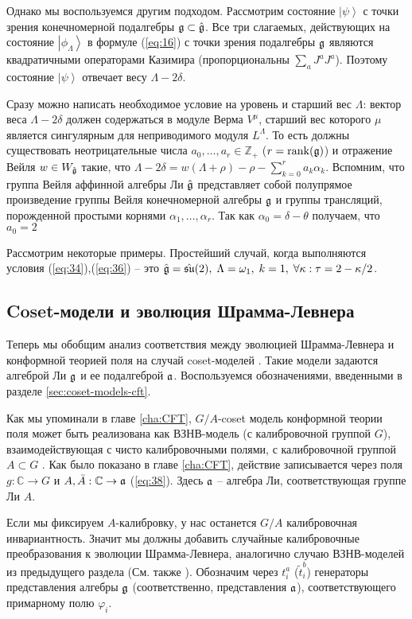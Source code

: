 Однако мы воспользуемся другим подходом. Рассмотрим состояние $\left|\psi\right>$ с точки зрения конечномерной подалгебры $\mathfrak{g}\subset\hat{\mathfrak{g}}$. Все три слагаемых, действующих на состояние $\left|\phi_{\Lambda}\right>$ в формуле (\ref{eq:16}) с точки зрения подалгебры $\mathfrak{g}$ являются квадратичными операторами Казимира (пропорциональны $\sum_a J^a J^a$). Поэтому состояние $\left|\psi\right>$ отвечает весу $\Lambda-2\delta$. 

Сразу можно написать необходимое условие на уровень и старший вес $\Lambda$: вектор веса  $\Lambda-2\delta$ должен содержаться в модуле Верма $V^{\mu}$, старший вес которого $\mu$ является сингулярным для неприводимого модуля $L^{\Lambda}$. То есть должны существовать неотрицательные числа $a_0,\dots,a_r\in \mathbb{Z}_+$ ($r=\mathrm{rank}(\mathfrak{g})$) и отражение Вейля $w\in W_{\hat{\mathfrak{g}}}$ такие, что $\Lambda-2\delta = w(\Lambda+\rho)-\rho-\sum_{k=0}^r a_k \alpha_k$. 
Вспомним, что группа Вейля аффинной алгебры Ли $\hat{\mathfrak{g}}$  представляет собой полупрямое произведение группы Вейля конечномерной алгебры $\mathfrak{g}$ и группы трансляций, порожденной простыми корнями $\alpha_1,\dots,\alpha_r$. 
Так как $\alpha_0 = \delta-\theta$ получаем, что $a_0=2$

Рассмотрим некоторые примеры. 
Простейший случай, когда выполняются условия (\ref{eq:34}),(\ref{eq:36}) -- это $\hat{\mathfrak{g}} = \hat{\mathfrak{su}}(2),\; \Lambda=\omega_1,\; k=1,\; \forall \kappa: \tau = 2-\kappa/2$. 


\subsection{Coset-модели и эволюция Шрамма-Левнера}
\label{sec:coset-models-sle}
Теперь мы обобщим анализ соответствия между эволюцией Шрамма-Левнера и конформной теорией поля на случай coset-моделей \cite{Goddard198588}. Такие модели задаются алгеброй Ли $\mathfrak{g}$ и ее подалгеброй $\mathfrak{a}$. Воспользуемся обозначениями, введенными в разделе \ref{sec:coset-models-cft}.

Как мы упоминали в главе \ref{cha:CFT}, $G/A$-coset модель конформной теории поля может быть реализована как ВЗНВ-модель (с калибровочной группой $G$), взаимодействующая с чисто калибровочными полями, с калибровочной группой $A\subset G$ \cite{gawdzki1988g,figueroa89equivalence}. Как было показано в главе \ref{cha:CFT}, действие записывается через поля  $g:\mathbb{C}\to G$ и $A,\bar A:\mathbb{C}\to \mathfrak{a}$ (\ref{eq:38}). Здесь $\mathfrak{a}$ -- алгебра Ли, соответствующая группе Ли $A$.

Если мы фиксируем  $A$-калибровку, у нас останется  $G/A$ калибровочная инвариантность. Значит мы должны добавить случайные калибровочные преобразования к эволюции Шрамма-Левнера, аналогично случаю ВЗНВ-моделей из предыдущего раздела (См. также \cite{bettelheim2005stochastic}).  Обозначим через $t^{a}_{i}$ ($\tilde{t}^{b}_{i}$) генераторы представления алгебры $\mathfrak{g}$ (соответственно, представления $\mathfrak{a}$), соответствующего примарному полю $\varphi_{i}$.

